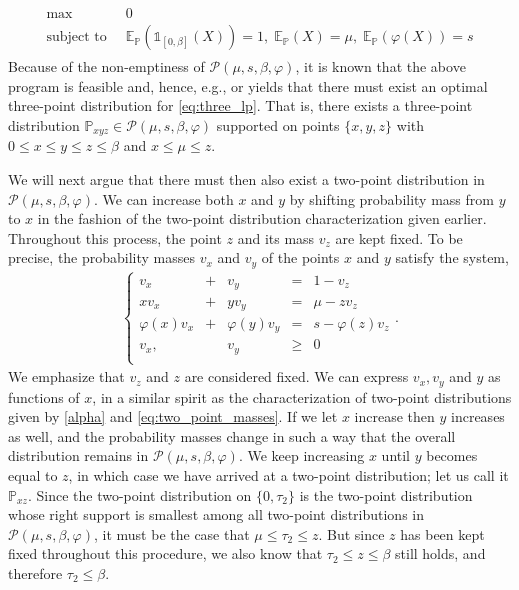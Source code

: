 \documentclass[11pt]{article}
\renewcommand{\P}{\mathbb{P}}
\newcommand{\E}{\mathbb{E}}
\newcommand{\cP}{\mathcal{P}}
\newcommand{\cPpar}{\mathcal{P}(\mu,s,\beta,\varphi)}
\newcommand{\1}{\mathds{1}}
\begin{document}
\begin{align}\label{eq:three_lp}
\begin{array}{ll}
    \max \; \; & 0 \\
    \text{subject to} \; \; & \E_{\P}(\1_{[0,\beta]}(X)) = 1,\; \E_{\P}(X) = \mu,\; \E_{\P}(\varphi(X)) = s
\end{array}
\end{align}
Because of the non-emptiness of $\cPpar$, it is known that the above program is feasible and, hence, e.g., \cite[Theorem 1]{rogosinski1958moments} or \cite[Lemma 3.1]{shapiro2001duality} yields that there must exist an optimal three-point distribution for \eqref{eq:three_lp}. That is, there exists a three-point distribution $\P_{xyz} \in \cPpar$ supported on points $\{x,y,z\}$ with $0 \leq x \leq y \leq z \leq \beta$ and $x \leq \mu \leq z$. 

We will next argue that there must then also exist a two-point distribution in $\cPpar$. We can increase both $x$ and $y$ by shifting probability mass from $y$ to $x$ in the fashion of the two-point distribution characterization given earlier. Throughout this process, the point $z$ and its mass $v_z$ are kept fixed. To be precise, the probability masses $v_x$ and $v_y$ of the points $x$ and $y$ satisfy the system, 
\begin{align}
    \left\{
\begin{array}{rrrrl}
     v_x & + & v_y &= & 1 - v_z \\
      x v_x  & + & y v_y  &= & \mu - z v_z  \\
     \varphi(x) v_x & + & \varphi(y)v_y &  = & s - \varphi(z) v_z\\
     v_x, &  & v_y & \geq & 0 \\
\end{array}\right. .
\label{eq:equations_threepoint}
\end{align}
We emphasize that $v_z$ and $z$ are considered fixed. We can express $v_x, v_y$ and $y$ as functions of $x$, in a similar spirit as the characterization of two-point distributions given by \eqref{alpha} and \eqref{eq:two_point_masses}. If we let $x$ increase then $y$ increases as well, and the probability masses change in such a way that the overall distribution remains in $\cPpar$. We keep increasing $x$ until $y$ becomes equal to $z$, in which case we have arrived at a two-point distribution; let us call it $\P_{xz}$. {Since the two-point distribution on $\{0,\tau_2\}$ is the two-point distribution whose right support is smallest among all two-point distributions in $\cP(\mu,s,\beta,\varphi)$}, it must be the case that $\mu \leq \tau_2 \leq z$. But since $z$ has been kept fixed throughout this procedure, we also know that $\tau_2 \leq z \leq \beta$ still holds, and therefore $\tau_2 \leq \beta$.
\end{document}
